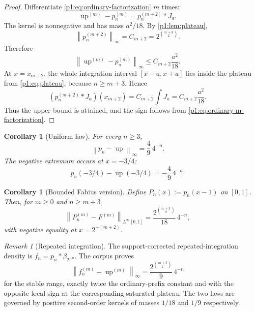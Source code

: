 \documentclass[11pt]{article}
\numberwithin{equation}{section}
\newtheorem{corollary}[theorem]{Corollary}
\theoremstyle{definition}
\theoremstyle{remark}
\newtheorem{remark}[theorem]{Remark}
\newcommand{\Up}{\operatorname{up}}
\newcommand{\norm}[1]{\left\lVert#1\right\rVert}
\begin{document}
\begin{proof}
Differentiate \eqref{p1:eq:ordinary-factorization} $m$ times:
\begin{equation}
 \Up^{(m)}-p_n^{(m)}=p_n^{(m+2)}*J_a.
 \label{p1:eq:ordinary-m-factorization}
\end{equation}
The kernel is nonnegative and has mass $a^2/18$.  By \cref{p1:lem:plateau},
\[
 \norm{p_n^{(m+2)}}_\infty=C_{m+2}=2^{\binom{m+3}{2}}.
\]
Therefore
\[
 \norm{\Up^{(m)}-p_n^{(m)}}_\infty
 \le C_{m+2}\frac{a^2}{18}.
\]
At $x=x_{m+2}$, the whole integration interval
\([x-a,x+a]\) lies inside the plateau from \eqref{p1:eq:plateau}, because $n\ge m+3$.  Hence
\[
 (p_n^{(m+2)}*J_a)(x_{m+2})
 =C_{m+2}\int J_a
 =C_{m+2}\frac{a^2}{18}.
\]
Thus the upper bound is attained, and the sign follows from \eqref{p1:eq:ordinary-m-factorization}.
\end{proof}

\begin{corollary}[Uniform law]
\label{p1:cor:ordinary-uniform}
For every $n\ge3$,
\begin{equation}
 \boxed{\norm{p_n-\Up}_\infty=\frac49\,4^{-n}.}
 \label{p1:eq:ordinary-uniform}
\end{equation}
The negative extremum occurs at $x=-3/4$:
\begin{equation}
 p_n(-3/4)-\Up(-3/4)=-\frac49\,4^{-n}.
 \label{p1:eq:ordinary-at-34}
\end{equation}
\end{corollary}

\begin{corollary}[Bounded Fabius version]
\label{p1:cor:F-ordinary}
Define $P_n(x):=p_n(x-1)$ on $[0,1]$.  Then, for $m\ge0$ and $n\ge m+3$,
\begin{equation}
 \norm{P_n^{(m)}-F^{(m)}}_{L^\infty[0,1]}
 =\frac{2^{\binom{m+3}{2}}}{18}\,4^{-n},
 \label{p1:eq:F-ordinary}
\end{equation}
with negative equality at $x=2^{-(m+2)}$.
\end{corollary}

\begin{remark}[Repeated integration]
The support-corrected repeated-integration density is
\(f_n=p_n*\beta_{2^{-n}}\).  The corpus proves
\[
 \norm{f_n^{(m)}-\Up^{(m)}}_\infty
 =\frac{2^{\binom{m+3}{2}}}{9}\,4^{-n}
\]
for the stable range, exactly twice the ordinary-prefix constant and with the opposite local sign at the corresponding saturated plateau.  The two laws are governed by positive second-order kernels of masses $1/18$ and $1/9$ respectively.
\end{remark}
\end{document}
